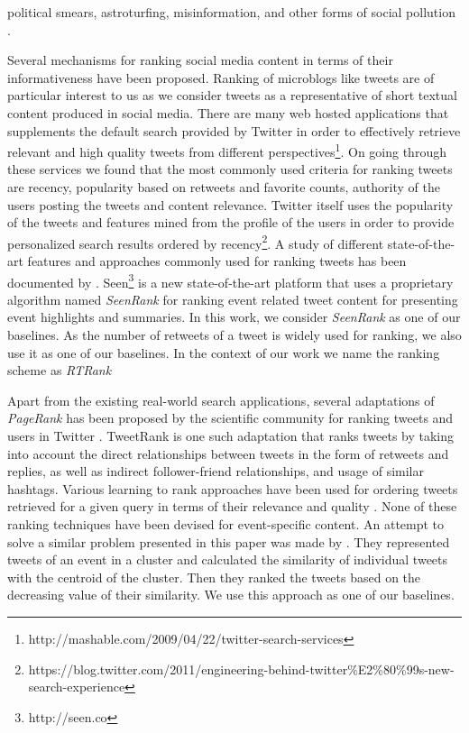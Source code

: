 political smears, astroturfing, misinformation, and other forms of social pollution \cite{ratkiewicz2011truthy}.


Several mechanisms for ranking social media content in terms of their informativeness have been proposed. Ranking of microblogs like tweets are of particular interest to us as we consider tweets as a representative of short textual content produced in social media. There are many web hosted applications that supplements the default search provided by Twitter in order to effectively retrieve relevant and high quality tweets from different perspectives\footnote{\tiny http://mashable.com/2009/04/22/twitter-search-services}. On going through these services we found that the most commonly used criteria for ranking tweets are recency, popularity based on retweets and favorite counts, authority of the users posting the tweets and content relevance. Twitter itself uses the popularity of the tweets and features mined from the profile of the users in order to provide personalized search results ordered by recency\footnote{\tiny https://blog.twitter.com/2011/engineering-behind-twitter\%E2\%80\%99s-new-search-experience}. A study of different state-of-the-art features and approaches commonly used for ranking tweets has been documented by \cite{Damak2013, nagmoti2010ranking}. Seen\footnote{\tiny http://seen.co} is a new state-of-the-art platform that uses a proprietary algorithm named \textit{SeenRank} for ranking event related tweet content for presenting event highlights and summaries. In this work, we consider \textit{SeenRank} as one of our baselines. As the number of retweets of a tweet is widely used for ranking, we also use it as one of our baselines. In the context of our work we name the ranking scheme as \textit{RTRank}

Apart from the existing real-world search applications, several adaptations of \textit{PageRank} \cite{page1999pagerank} has been proposed by the scientific community for ranking tweets and users in Twitter \cite{weng2010twitterrank,tunkelang2009twitter, hallberg2012adaptation}. TweetRank \cite{hallberg2012adaptation} is one such adaptation that ranks tweets by taking into account the direct relationships between tweets in the form of retweets and replies, as well as indirect follower-friend relationships, and usage of similar hashtags. Various learning to rank approaches have been used for ordering tweets retrieved for a given query in terms of their relevance and quality \cite{Duan2010,mccreadie2013relevance,vosecky2012searching}. None of these ranking techniques have been devised for event-specific content. An attempt to solve a similar problem presented in this paper was made by \cite{becker2011selecting}. They represented tweets of an event in a cluster and calculated the similarity of individual tweets with the centroid of the cluster. Then they ranked the tweets based on the decreasing value of their similarity. We use this approach as one of our baselines.

